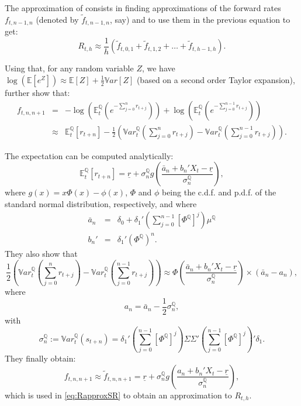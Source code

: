 \documentclass[
  12pt,
]{book}
\theoremstyle{definition}
\theoremstyle{definition}
\theoremstyle{definition}
\theoremstyle{definition}
\theoremstyle{remark}
\begin{document}
The approximation of \citet{Wu_Xia_2016} consists in finding approximations of the forward rates \(f_{t,n-1,n}\) (denoted by \(\tilde{f}_{t,n-1,n}\), say) and to use them in the previous equation to get:
\begin{equation}
\boxed{R_{t,h} \approx  \frac{1}{h}\left(\tilde{f}_{t,0,1}+\tilde{f}_{t,1,2}+\dots+\tilde{f}_{t,h-1,h}\right).}\label{eq:RapproxSR}
\end{equation}

Using that, for any random variable \(Z\), we have \(\log(\mathbb{E}[e^Z]) \approx \mathbb{E}[Z] + \frac{1}{2} \mathbb{V}ar[Z]\) (based on a second order Taylor expansion), \citet{Wu_Xia_2016} further show that:
\begin{eqnarray}
f_{t,n,n+1} &=& -\log\left(\mathbb{E}_t^{\mathbb{Q}}\left(e^{-\sum_{j=0}^n r_{t+j}}\right)\right) + \log\left(\mathbb{E}_t^{\mathbb{Q}}\left(e^{-\sum_{j=0}^{n-1} r_{t+j}}\right)\right)\\
&\approx& \mathbb{E}_t^{\mathbb{Q}}[r_{t+n}] - \frac{1}{2}\left(\mathbb{V}ar_t^{\mathbb{Q}}\left(\sum_{j=0}^n r_{t+j}\right)-\mathbb{V}ar_t^{\mathbb{Q}}\left(\sum_{j=0}^{n-1} r_{t+j}\right)\right).
\end{eqnarray}

The expectation can be computed analytically:
\[
\mathbb{E}_t^{\mathbb{Q}}[r_{t+n}] = \underline{r} + \sigma_n^{\mathbb{Q}}g\left(\frac{\bar{a}_n + b_n'X_t - \underline{r}}{\sigma_n^{\mathbb{Q}}}\right),
\]
where \(g(x)= x\Phi(x)-\phi(x)\), \(\Phi\) and \(\phi\) being the c.d.f. and p.d.f. of the standard normal distribution, respectively, and where
\begin{eqnarray*}
\bar{a}_n &=& \delta_0 + \delta_1'\left(\sum_{j=0}^{n-1} \left[\Phi^{\mathbb{Q}}\right]^j\right)\mu^{\mathbb{Q}}\\
b_n' &=& \delta_1'\left(\Phi^{\mathbb{Q}}\right)^n.
\end{eqnarray*}
They also show that
\[
\frac{1}{2}\left(\mathbb{V}ar_t^{\mathbb{Q}}\left(\sum_{j=0}^n r_{t+j}\right)-\mathbb{V}ar_t^{\mathbb{Q}}\left(\sum_{j=0}^{n-1} r_{t+j}\right)\right) \approx \Phi\left(\frac{\bar{a}_n + b_n'X_t - \underline{r}}{\sigma_n^{\mathbb{Q}}}\right)\times(\bar{a}_n - a_n),
\]
where
\[
a_n = \bar{a}_n - \frac{1}{2}\sigma_n^{\mathbb{Q}},
\]
with
\[
\sigma_n^{\mathbb{Q}} := \mathbb{V}ar^{\mathbb{Q}}_t\left(s_{t+n}\right)= \delta_1'\left(\sum_{j=0}^{n-1} \left[\Phi^{\mathbb{Q}}\right]^j\right)\Sigma \Sigma' \left(\sum_{j=0}^{n-1} \left[\Phi^{\mathbb{Q}}\right]^j\right)'\delta_1.
\]
They finally obtain:
\[
\boxed{f_{t,n,n+1} \approx \tilde{f}_{t,n,n+1} = \underline{r} + \sigma_n^{\mathbb{Q}}g\left(\frac{a_n + b_n'X_t - \underline{r}}{\sigma_n^{\mathbb{Q}}}\right),}
\]
which is used in \eqref{eq:RapproxSR} to obtain an approximation to \(R_{t,h}\).
\end{document}
